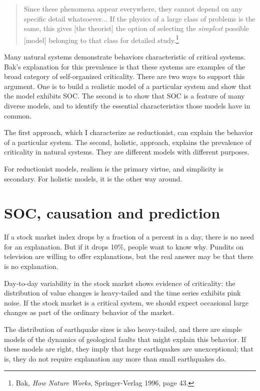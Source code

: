 \documentclass[12pt]{book}
\theoremstyle{exercise}
\begin{document}
\begin{quote}
Since these phenomena appear everywhere, they cannot depend on any
specific detail whatsoever...  If the physics of a large class of
problems is the same, this gives [the theorist] the option of selecting
the {\em simplest} possible [model] belonging to that class for detailed
study.\footnote{Bak, {\em How Nature Works}, Springer-Verlag 1996, page 43.}
\end{quote}


Many natural systems demonstrate behaviors characteristic of critical
systems.  Bak's explanation for this prevalence is that these systems
are examples of the broad category of self-organized criticality.
There are two ways to support this argument.  One is to build
a realistic model of a particular system and show that the model
exhibits SOC.  The second is to show that SOC is a feature of many
diverse models, and to identify the essential characteristics
those models have in common.

The first approach, which I characterize as reductionist, can explain
the behavior of a particular system.  The second, holistic, approach,
explains the prevalence of criticality in natural systems.  They are
different models with different purposes.


For reductionist models, realism is the primary virtue, and simplicity
is secondary.  For holistic models, it is the other way around.


\section{SOC, causation and prediction}

If a stock market index drops by a fraction of a percent in a
day, there is no need for an explanation.  But if it drops 10\%,
people want to know why.  Pundits
on television are willing to offer explanations, but the real
answer may be that there is no explanation.


Day-to-day variability in the stock market shows evidence of
criticality: the distribution of value changes is heavy-tailed
and the time series exhibits pink noise.
If the stock market is a critical system, we
should expect occasional large changes as part of the ordinary
behavior of the market.

The distribution of earthquake sizes is also heavy-tailed,
and there are simple models of the dynamics of geological faults
that might explain this behavior.  If these models are right,
they imply that large earthquakes are unexceptional; that is,
they do not require explanation any more than
small earthquakes do.
\end{document}
